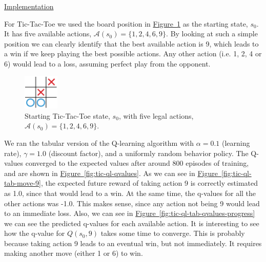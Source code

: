 \documentclass{article}
\newcommand{\GithubURL}[2]{
\noindent
\href{https://github.com/davidrobles/mlnd-capstone-code/blob/master/#1}{#2}
\break
}
\begin{document}
\GithubURL{examples/tic_ql_tab_full.py}{Implementation}

For Tic-Tac-Toe we used the board position in \hyperref[fig:tic-ql-tab-cur]
{Figure~\ref*{fig:tic-ql-tab-cur}} as the starting state, $s_0$. It has five available actions,
$\mathcal{A}(s_0) = \{1, 2, 4, 6, 9\}$. By looking at such a simple position we can clearly identify
that the best available action is 9, which leads to a win if we keep playing the best possible
actions. Any other action (i.e. 1, 2, 4 or 6) would lead to a loss, assuming perfect play from the
opponent.

\begin{figure}[!h]
    \centering
    \includegraphics[width=0.15\textwidth]{figures/tic_ql_tab_current.pdf}
    \caption{Starting Tic-Tac-Toe state, $s_0$, with five legal actions, $\mathcal{A}(s_0) = \{1, 2, 4, 6, 9\}$.}
    \label{fig:tic-ql-tab-cur}
\end{figure}

We ran the tabular version of the Q-learning algorithm with $\alpha = 0.1$ (learning rate),
$\gamma=1.0$ (discount factor), and a uniformly random behavior policy. The Q-values converged to
the expected values after around 800 episodes of training, and are shown in
\hyperref[fig:tic-ql-qvalues] {Figure~\ref*{fig:tic-ql-qvalues}}. As we can see in
\hyperref[fig:tic-ql-tab-move-9] {Figure~\ref*{fig:tic-ql-tab-move-9}}, the expected future reward
of taking action 9 is correctly estimated as 1.0, since that would lead to a win. At the same time,
the q-values for all the other actions was -1.0. This makes sense, since any action not being 9
would lead to an immediate loss. Also, we can see in \hyperref[fig:tic-ql-tab-qvalues-progress]
{Figure~\ref*{fig:tic-ql-tab-qvalues-progress}} we can see the predicted q-values for each available
action. It is interesting to see how the q-value for $Q(s_0, 9)$ takes some time to converge. This
is probably because taking action 9 leads to an eventual win, but not immediately. It requires
making another move (either 1 or 6) to win.


\end{document}
